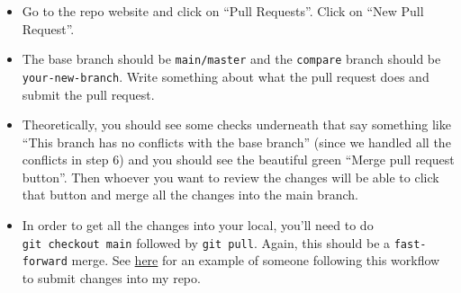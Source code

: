 \documentclass[
]{article}
\providecommand{\tightlist}{%
  \setlength{\itemsep}{0pt}\setlength{\parskip}{0pt}}
\begin{document}
\begin{enumerate}
\begin{enumerate}
    \begin{itemize}
    \tightlist
    \item
      Go to the repo website and click on ``Pull Requests''. Click on
      ``New Pull Request''.
    \item
      The base branch should be \texttt{main/master} and the
      \texttt{compare} branch should be \texttt{your-new-branch}. Write
      something about what the pull request does and submit the pull
      request.
    \item
      Theoretically, you should see some checks underneath that say
      something like ``This branch has no conflicts with the base
      branch'' (since we handled all the conflicts in step 6) and you
      should see the beautiful green ``Merge pull request button''. Then
      whoever you want to review the changes will be able to click that
      button and merge all the changes into the main branch.
    \item
      In order to get all the changes into your local, you'll need to do
      \texttt{git\ checkout\ main} followed by \texttt{git\ pull}.
      Again, this should be a \texttt{fast-forward} merge. See
      \href{https://github.com/pommevilla/friendly-dollop/pull/2}{here}
      for an example of someone following this workflow to submit
      changes into my repo.
    \end{itemize}
  \end{enumerate}
\end{enumerate}
\end{document}
